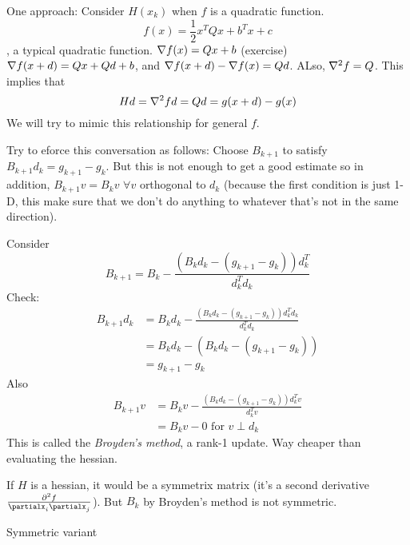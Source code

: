 One approach: Consider $H(x_k)$ when $f$ is a quadratic
function. $$f(x) = \frac{1}{2}x^TQx + b^Tx + c$$, a typical quadratic
function.
$\nabla f(x) = Qx+b$ (exercise)
$\nabla f(x+d) = Qx + Qd + b$, and $\nabla f(x+d) - \nabla f(x) = Qd$.
ALso, $\nabla^2 f = Q$. This implies that $$Hd = \nabla^2f d = Qd = g(x+d) - g(x)$$ We
will try to mimic this relationship for general $f$. 

Try to eforce this conversation as follows:
Choose $B_{k+1}$ to satisfy $B_{k+1}d_k = g_{k+1} - g_k$. But this is
not enough to get a good estimate so in addition,
$B_{k+1}v = B_kv$ $\forall v$ orthogonal to $d_k$ (because the first
condition is just 1-D, this make sure that we don't do anything to
whatever that's not in the same direction).

Consider
$$B_{k+1} = B_k - \frac{(B_kd_k - (g_{k+1} - g_k))d_k^T}{d_k^Td_k}$$
Check: 
\begin{align*}
B_{k+1}d_k &= B_kd_k - \frac{(B_kd_k - (g_{k+1} -
  g_k))d_k^Td_k}{d_k^Td_k}\\  
&= B_kd_k - (B_kd_k - (g_{k+1} - g_k))\\  
&= g_{k+1} - g_k
\end{align*}
Also 
\begin{align*}
  B_{k+1}v &= B_kv - \frac{(B_kd_k - (g_{k+1} -
    g_k))d_k^Tv}{d_k^Tv}\\  
&= B_kv - 0 \text{ for $v \perp d_k$}
\end{align*}
This is called the \emph{Broyden's method}, a rank-1 update. Way
cheaper than evaluating the hessian.

If $H$ is a hessian, it would be a symmetrix matrix (it's a second
derivative $\frac{\partial^2 f}{\partialx_i\partialx_j}$). But $B_k$
by Broyden's method is not symmetric.

Symmetric variant


